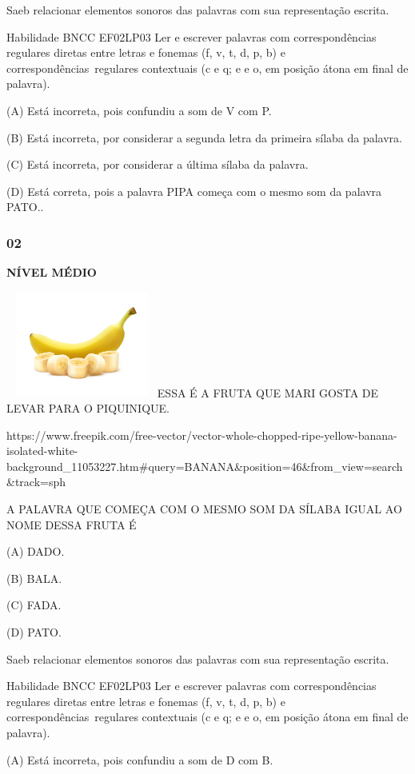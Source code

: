 Saeb relacionar elementos sonoros das palavras com sua representação
escrita.

Habilidade BNCC EF02LP03 Ler e escrever palavras com correspondências
regulares diretas entre letras e fonemas (f, v, t, d, p, b) e
correspondências~regulares contextuais (c e q; e e o, em posição átona
em final de palavra).

(A) Está incorreta, pois confundiu a som de V com P.

(B) Está incorreta, por considerar a segunda letra da primeira sílaba da
palavra.

(C) Está incorreta, por considerar a última sílaba da palavra.

(D) Está correta, pois a palavra PIPA começa com o mesmo som da palavra
PATO..

\subsubsection{02}\label{section-144}

\textbf{NÍVEL MÉDIO}

\includegraphics[width=1.96704in,height=1.37153in]{media/image175.jpeg}ESSA
É A FRUTA QUE MARI GOSTA DE LEVAR PARA O PIQUINIQUE.

https://www.freepik.com/free-vector/vector-whole-chopped-ripe-yellow-banana-isolated-white-background\_11053227.htm\#query=BANANA\&position=46\&from\_view=search\&track=sph

A PALAVRA QUE COMEÇA COM O MESMO SOM DA SÍLABA IGUAL AO NOME DESSA FRUTA
É

(A) DADO.

(B) BALA.

(C) FADA.

(D) PATO.

Saeb relacionar elementos sonoros das palavras com sua representação
escrita.

Habilidade BNCC EF02LP03 Ler e escrever palavras com correspondências
regulares diretas entre letras e fonemas (f, v, t, d, p, b) e
correspondências~regulares contextuais (c e q; e e o, em posição átona
em final de palavra).

(A) Está incorreta, pois confundiu a som de D com B.

